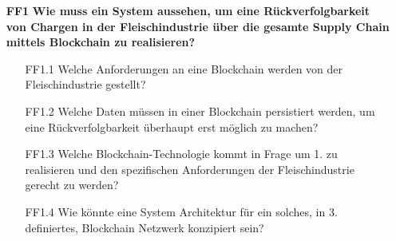 \begin{itemize}
  \item[\textbf{FF1}] \textbf{Wie muss ein System aussehen, um eine Rückverfolgbarkeit von Chargen in der Fleischindustrie über die gesamte Supply Chain mittels Blockchain zu realisieren?}
  \begin{itemize}
    \item[FF1.1] Welche Anforderungen an eine Blockchain werden von der Fleischindustrie gestellt?
    \item[FF1.2] Welche Daten müssen in einer Blockchain persistiert werden, um eine Rückverfolgbarkeit überhaupt erst möglich zu machen?
    \item[FF1.3] Welche Blockchain-Technologie kommt in Frage um 1. zu realisieren und den spezifischen Anforderungen der Fleischindustrie gerecht zu werden?
    \item[FF1.4] Wie könnte eine System Architektur für ein solches, in 3. definiertes, Blockchain Netzwerk konzipiert sein?
  \end{itemize}
\end{itemize}


\newpage
